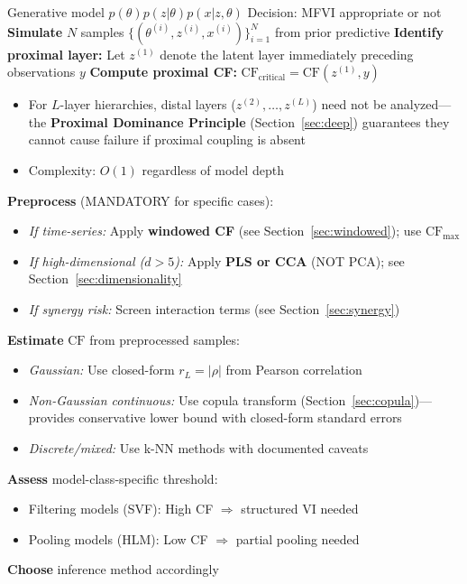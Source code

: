 \documentclass[10pt]{article} %
\theoremstyle{plain}
\theoremstyle{definition}
\newcommand{\CF}{\mathrm{CF}}
\begin{document}
\begin{algorithm}[!htbp]
\caption{Prior Predictive CF Diagnostic}
\label{alg:workflow}
\begin{algorithmic}[1]
\Require Generative model $p(\theta)p(z|\theta)p(x|z,\theta)$
\Ensure Decision: MFVI appropriate or not
\State \textbf{Simulate} $N$ samples $\{(\theta^{(i)}, z^{(i)}, x^{(i)})\}_{i=1}^N$ from prior predictive
\State \textbf{Identify proximal layer:} Let $z^{(1)}$ denote the latent layer immediately preceding observations $y$
\State \textbf{Compute proximal CF:} $\text{CF}_{\text{critical}} = \text{CF}(z^{(1)}, y)$
\begin{itemize}
    \item For $L$-layer hierarchies, distal layers ($z^{(2)}, \ldots, z^{(L)}$) need not be analyzed---the \textbf{Proximal Dominance Principle} (Section~\ref{sec:deep}) guarantees they cannot cause failure if proximal coupling is absent
    \item Complexity: $O(1)$ regardless of model depth
\end{itemize}
\State \textbf{Preprocess} (MANDATORY for specific cases):
\begin{itemize}
    \item \textit{If time-series:} Apply \textbf{windowed CF} (see Section~\ref{sec:windowed}); use $\text{CF}_{\max}$
    \item \textit{If high-dimensional ($d > 5$):} Apply \textbf{PLS or CCA} (NOT PCA); see Section~\ref{sec:dimensionality}
    \item \textit{If synergy risk:} Screen interaction terms (see Section~\ref{sec:synergy})
\end{itemize}
\State \textbf{Estimate} $\CF$ from preprocessed samples:
\begin{itemize}
    \item \textit{Gaussian:} Use closed-form $r_L = |\rho|$ from Pearson correlation
    \item \textit{Non-Gaussian continuous:} Use copula transform (Section~\ref{sec:copula})---provides conservative lower bound with closed-form standard errors
    \item \textit{Discrete/mixed:} Use k-NN methods with documented caveats \citep{vandenberg2025linfoot}
\end{itemize}
\State \textbf{Assess} model-class-specific threshold:
\begin{itemize}
    \item Filtering models (SVF): High CF $\Rightarrow$ structured VI needed
    \item Pooling models (HLM): Low CF $\Rightarrow$ partial pooling needed
\end{itemize}
\State \textbf{Choose} inference method accordingly
\end{algorithmic}
\end{algorithm}
\end{document}
